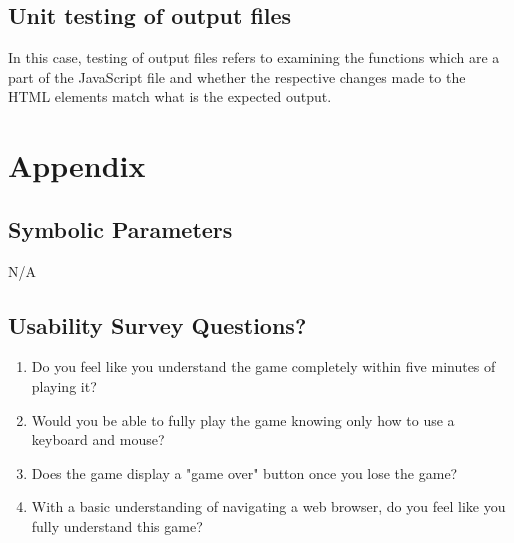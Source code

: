 \documentclass[12pt, titlepage]{article}
\begin{document}
\subsection{Unit testing of output files}
        In this case, testing of output files refers to examining the functions which are a part of the JavaScript file and whether the respective changes made to the HTML elements match what is the expected output.





\newpage

\section{Appendix}

\subsection{Symbolic Parameters}

N/A

\subsection{Usability Survey Questions?}

\begin{enumerate}
    \item Do you feel like you understand the game completely within five minutes of playing it?
    \item Would you be able to fully play the game knowing only how to use a keyboard and mouse?
    \item Does the game display a "game over" button once you lose the game?
    \item With a basic understanding of navigating a web browser, do you feel like you fully understand this game?
\end{enumerate}
\end{document}
